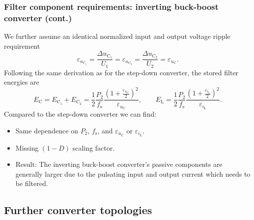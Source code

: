 \begin{frame}
    \frametitle{Filter component requirements: inverting buck-boost converter (cont.)}
    \onslide<+->We further assume an identical normalized input and output voltage ripple requirement 
    $$
    \varepsilon_{u_\mathrm{C_1}} =\frac{\Delta u_\mathrm{C_1}}{U_1} =  \varepsilon_{u_\mathrm{C_2}} = \frac{\Delta u_\mathrm{C_2}}{U_2} = \varepsilon_{u_\mathrm{C}}.
    $$\onslide<+->
    Following the same derivation as for the step-down converter, the stored filter energies are
    \begin{equation}
            E_\mathrm{C} = E_\mathrm{C_1} + E_\mathrm{C_2} = \frac{1}{2} \frac{P_2}{f_\mathrm{s}}\frac{\left(1+\frac{\varepsilon_{u_\mathrm{C}}}{2}\right)^2}{\varepsilon_{u_\mathrm{C}}}, \qquad
            E_\mathrm{L} = \frac{1}{2} \frac{P_2}{f_\mathrm{s}}\frac{\left(1+\frac{\varepsilon_{i_\mathrm{L}}}{2}\right)^2}{\varepsilon_{i_\mathrm{L}}}.
    \end{equation}
    Compared to the step-down converter we can find:
    \begin{itemize}
        \item<3-> Same dependence on $P_2$, $f_\mathrm{s}$, and $\varepsilon_{u_\mathrm{C}}$ or $\varepsilon_{i_\mathrm{L}}$.
        \item<4-> Missing $(1-D)$ scaling factor.
        \item<4-> Result: The inverting buck-boost converter's passive components are generally larger due to the pulsating input and output current which needs to be filtered.
    \end{itemize} 
\end{frame}

\subsection{Further converter topologies}


